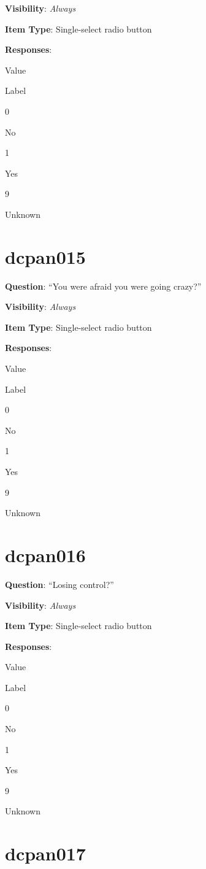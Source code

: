 \documentclass[]{book}
\begin{document}
\textbf{Visibility}: \emph{Always}

\textbf{Item Type}: Single-select radio button

\textbf{Responses}:

Value

Label

0

No

1

Yes

9

Unknown

\hypertarget{dcpan015}{%
\section{dcpan015}\label{dcpan015}}

\textbf{Question}: ``You were afraid you were going crazy?''

\textbf{Visibility}: \emph{Always}

\textbf{Item Type}: Single-select radio button

\textbf{Responses}:

Value

Label

0

No

1

Yes

9

Unknown

\hypertarget{dcpan016}{%
\section{dcpan016}\label{dcpan016}}

\textbf{Question}: ``Losing control?''

\textbf{Visibility}: \emph{Always}

\textbf{Item Type}: Single-select radio button

\textbf{Responses}:

Value

Label

0

No

1

Yes

9

Unknown

\hypertarget{dcpan017}{%
\section{dcpan017}\label{dcpan017}}
\end{document}
